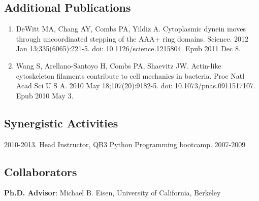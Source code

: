 \documentclass{proposal}
\begin{document}
\subsection*{Additional Publications}
\begin{enumerate}
\item DeWitt MA, Chang AY, Combs PA, Yildiz A. Cytoplasmic dynein moves through uncoordinated stepping of the AAA+ ring domains. Science. 2012 Jan 13;335(6065):221-5. doi: 10.1126/science.1215804. Epub 2011 Dec 8.
\item Wang S, Arellano-Santoyo H, Combs PA, Shaevitz JW. Actin-like cytoskeleton filaments contribute to cell mechanics in bacteria. Proc Natl Acad Sci U S A. 2010 May 18;107(20):9182-5. doi: 10.1073/pnas.0911517107. Epub 2010 May 3.
\end{enumerate}


\subsection*{Synergistic Activities}
2010-2013. Head Instructor, QB3 Python Programming bootcamp.
2007-2009

\subsection*{Collaborators}

{\bf Ph.D. Advisor}: Michael B. Eisen, University of California, Berkeley
\end{document}
